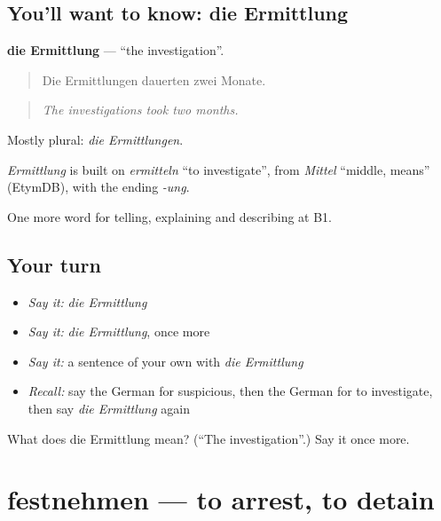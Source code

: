 \subsection*{You'll want to know: die Ermittlung}
\textbf{die Ermittlung} — \textquotedblleft{}the investigation\textquotedblright{}.

\begin{quote}
Die Ermittlungen dauerten zwei Monate.
\end{quote}

\begin{quote}
\emph{The investigations took two months.}
\end{quote}

Mostly plural: \emph{die Ermittlungen}.

\begin{cousinweb}
\emph{Ermittlung} is built on \emph{ermitteln} \textquotedblleft{}to investigate\textquotedblright{}, from \emph{Mittel} \textquotedblleft{}middle, means\textquotedblright{} (EtymDB), with the ending \emph{-ung}.
\end{cousinweb}

\begin{grammarlens}[title={What you've built}]
One more word for telling, explaining and describing at B1.
\end{grammarlens}

\subsection*{Your turn}
\begin{itemize}
\raggedright
  \item \emph{Say it:} \emph{die Ermittlung}
  \item \emph{Say it:} \emph{die Ermittlung}, once more
  \item \emph{Say it:} a sentence of your own with \emph{die Ermittlung}
  \item \emph{Recall:} say the German for suspicious, then the German for to investigate, then say \emph{die Ermittlung} again
\end{itemize}

\begin{tcolorbox}[breakable,colback=teal!4,colframe=teal!35!black,title={Before you move on}]
What does die Ermittlung mean? (\textquotedblleft{}The investigation\textquotedblright{}.) Say it once more.
\end{tcolorbox}
\section[festnehmen]{festnehmen — to arrest, to detain}

